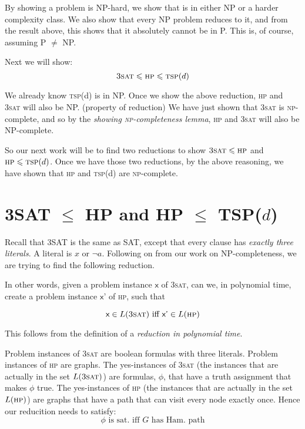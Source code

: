 By showing a problem is NP-hard, we show that is in either NP or 
a harder complexity class. We also show that
every NP problem reduces to it, and from the result above, 
this shows that it absolutely cannot be in P. 
This is, of course, assuming P $\neq$ NP. 



Next we will show:
$$\textsc{3sat} \leqslant \textsc{hp} \leqslant \textsc{tsp}(d)$$

We already know \textsc{tsp}(d) is in NP.
Once we show the above reduction, \textsc{hp} and \textsc{3sat} will also be NP. (property of reduction)
We have just shown that \textsc{3sat} is \textsc{np}-complete, and so by the
\textit{showing \textsc{np}-completeness lemma}, \textsc{hp} 
and \textsc{3sat} will also be NP-complete.

So our next work will be to find two reductions to show 
$\textsc{3sat} \leqslant \textsc{hp}$
and $\textsc{hp} \leqslant \textsc{tsp}(d)$. Once we have those two reductions, 
by the above reasoning, we have shown that \textsc{hp} and \textsc{tsp}(d) 
are \textsc{np}-complete. 



\section{3SAT $\leqslant$ HP and HP $\leqslant$ TSP($d$)}

Recall that 3SAT is the same as SAT, except that every clause has 
\textit{exactly three literals}. A literal is $x$ or $\neg a$. 
Following on from our work on NP-completeness, we are trying 
to find the following reduction.


In other words, given a problem instance $\textsf{x}$ of \textsc{3sat}, 
can we, in polynomial time, create a problem instance 
$\textsf{x'}$ of \textsc{hp}, such that

$$\textsf{x} \in L(\textsc{3sat}) \text{ iff } \textsf{x'} \in L(\textsc{hp})$$

This follows from the definition of a \textit{reduction in polynomial time}.

Problem instances of \textsc{3sat} are boolean formulas with three 
literals. Problem instances of \textsc{hp} are graphs.
The yes-instances of \textsc{3sat} (the instances that are actually 
in the set $L(\textsc{3sat})$) 
are formulas, $\phi$, that have a truth assignment that makes $\phi$ true. 
The yes-instances of \textsc{hp} (the instances that are actually 
in the set $L(\textsc{hp})$) 
are graphs that have a path that can visit every node exactly once.
Hence our reducition needs to satisfy: 
$$\phi \text{ is sat.} \text{ iff } G \text{ has Ham. path}$$

